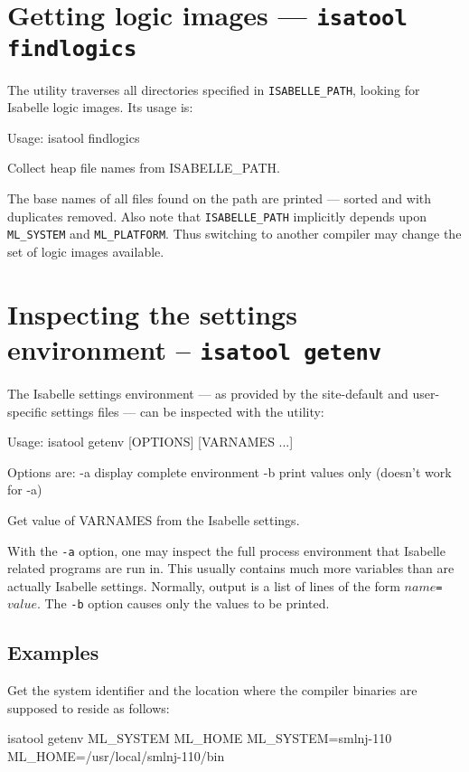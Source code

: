\section{Getting logic images --- \texttt{isatool findlogics}}

The  utility traverses all directories specified in
\texttt{ISABELLE_PATH}, looking for Isabelle logic images. Its usage
is:
\begin{ttbox}
Usage: isatool findlogics

  Collect heap file names from ISABELLE_PATH.
\end{ttbox}
The base names of all files found on the path are printed --- sorted and with
duplicates removed. Also note that \texttt{ISABELLE_PATH} implicitly depends
upon \texttt{ML_SYSTEM} and \texttt{ML_PLATFORM}. Thus switching to another
{\ML} compiler may change the set of logic images available.


\section{Inspecting the settings environment -- \texttt{isatool getenv}}
\label{sec:tool-getenv}

The Isabelle settings environment --- as provided by the site-default
and user-specific settings files --- can be inspected with the
 utility:
\begin{ttbox}
Usage: isatool getenv [OPTIONS] [VARNAMES ...]

  Options are:
    -a           display complete environment
    -b           print values only (doesn't work for -a)

  Get value of VARNAMES from the Isabelle settings.
\end{ttbox}

With the \texttt{-a} option, one may inspect the full process
environment that Isabelle related programs are run in. This usually
contains much more variables than are actually Isabelle settings.
Normally, output is a list of lines of the form
\mbox{$name$\texttt{=}$value$}. The \texttt{-b} option causes only the
values to be printed.


\subsection*{Examples}

Get the {\ML} system identifier and the location where the compiler
binaries are supposed to reside as follows:
\begin{ttbox}
isatool getenv ML_SYSTEM ML_HOME
{\out ML_SYSTEM=smlnj-110}
{\out ML_HOME=/usr/local/smlnj-110/bin}
\end{ttbox}

